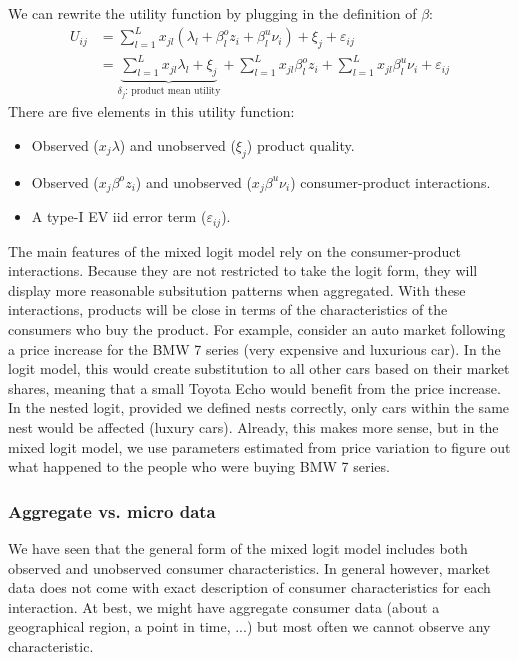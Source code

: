 We can rewrite the utility function by plugging in the definition of $\beta$: \begin{align*}
U_{ij} & = \sum_{l=1}^L x_{jl}\left(\lambda_l + \beta_l^o z_i + \beta_l^u \nu_i \right) + \xi_j + \varepsilon_{ij} \\
& = \underbrace{\sum_{l=1}^L x_{jl}\lambda_l + \xi_j}_{\delta_j\text{: product mean utility}} + \sum_{l=1}^L x_{jl}\beta_l^o z_i + \sum_{l=1}^L x_{jl}\beta_l^u \nu_i  + \varepsilon_{ij}
\end{align*}
There are five elements in this utility function:\begin{itemize}
\item Observed ($x_j\lambda$) and unobserved ($\xi_j$) product quality.
\item Observed ($x_{j}\beta^o z_i$) and unobserved ($x_{j}\beta^u \nu_i$) consumer-product interactions.
\item A type-I EV iid error term ($\varepsilon_{ij}$).
\end{itemize}
The main features of the mixed logit model rely on the consumer-product interactions. Because they are not restricted to take the logit form, they will display more reasonable subsitution patterns when aggregated. With these interactions, products will be close in terms of the characteristics of the consumers who buy the product. For example, consider an auto market following a price increase for the BMW 7 series (very expensive and luxurious car). In the logit model, this would create substitution to all other cars based on their market shares, meaning that a small Toyota Echo would benefit from the price increase. In the nested logit, provided we defined nests correctly, only cars within the same nest would be affected (luxury cars). Already, this makes more sense, but in the mixed logit model, we use parameters estimated from price variation to figure out what happened to the people who were buying BMW 7 series.

\subsubsection{Aggregate vs. micro data}

We have seen that the general form of the mixed logit model includes both observed and unobserved consumer characteristics. In general however, market data does not come with exact description of consumer characteristics for each interaction. At best, we might have aggregate consumer data (about a geographical region, a point in time, ...) but most often we cannot observe any characteristic.

